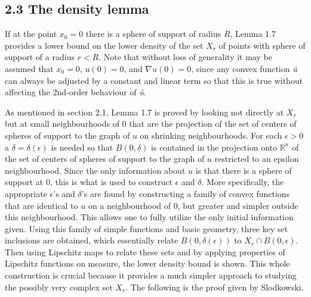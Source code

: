 \documentclass[10pt]{article}
\begin{document}
\subsection{2.3 The density lemma} 
If at the point $x_0=0$ there is a sphere of support of radius $R$, Lemma 1.7 provides a lower bound on the lower density of the set $X_r$ of points with sphere of support of a radius $r<R$. Note that without loss of generality it may be assumed that $x_0=0$, $u(0)=0$, and $\nabla u(0)=0$, since any convex function \textit{\~{u}} can always be adjusted by a constant and linear term so that this is true without affecting the 2nd-order behaviour of \textit{\~{u}}.

As mentioned in section 2.1, Lemma 1.7 is proved by looking not directly at $X_r$ but at small neighbourhoods of 0 that are the projection of the set of centers of spheres of support to the graph of $u$ on shrinking neighbourhoods. For each $\epsilon>0$ a $\delta=\delta(\epsilon)$ is needed so that $B(0,\delta)$ is contained in the projection onto $\mathbb{R}^n$ of the set of centers of spheres of support to the graph of $u$ restricted to an epsilon neighbourhood. Since the only information about $u$ is that there is a sphere of support at 0, this is what is used to construct $\epsilon$ and $\delta$. 
More specifically, the appropriate $\epsilon$'s and $\delta$'s are found by constructing a family of convex functions that are identical to $u$ on a neighbourhood of $0$, but greater and simpler outside this neighbourhood. This allows one to fully utilize the only initial information given. Using this family of simple functions and basic geometry, three key set inclusions are obtained, which essentially relate $B(0,\delta(\epsilon))$ to $X_r\cap B(0,\epsilon)$. Then using Lipschitz maps to relate these sets and by applying properties of Lipschitz functions on measure, the lower density bound is shown. This whole construction is crucial because it provides a much simpler approach to studying the possibly very complex set $X_r$. The following is the proof given by Slodkowski.
\end{document}
